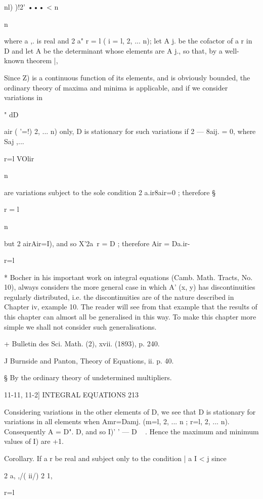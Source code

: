  nl)  )!2' ••• < n 

n 

where a ,. is real and 2 a" r = l ( i = l, 2, ... n); let A  j. be the cofactor of a r in D and 
let A be the determinant whose elements are A  j., so that, by a well-known theorem |, 

Since Z) is a continuous function of its elements, and is obviously bounded, the 
ordinary theory of maxima and minima is applicable, and if we consider variations in 

" dD 

air ( '=!) 2, ... n) only, D is stationary for such variations if 2   — 8aij. = 0, where Saj ,... 

r=l VOlir 

n 

are variations subject to the sole condition 2 a.ir8air=0 ; therefore § 

r = l 

n 

but 2 airAir=I), and so X'2a\ r = D ; therefore Air = Da.ir- 

r=l 

* Bocher in his important work on integral equations (Camb. Math. Tracts, No. 10), always 
considers the more general case in which A' (x, y) has discontinuities regularly distributed, 
i.e. the discontinuities are of the nature described in Chapter iv, example 10. The reader will 
see from that example that the results of this chapter can almost all be generalised in this 
way. To make this chapter more simple we shall not consider such generalisations. 

+ Bulletin des Sci. Math. (2), xvii. (1893), p. 240. 

J Burnside and Panton, Theory of Equations, ii. p. 40. 

§ By the ordinary theory of undetermined multipliers. 



11-11, 11-2] INTEGRAL EQUATIONS 213 

Considering variations in the other elements of D, we see that D is stationary for 
variations in all elements when Amr=Damj. (m=l, 2, ... n ; r=l, 2, ... n). Consequently 
A = D". D, and so I)' '  — D ~ . Hence the maximum and minimum values of I) are +1. 

Corollary. If a r be real and subject only to the condition | a  I <  j since 

2  a, ,/( ii/) 2 1, 

r=l 

